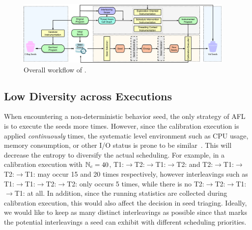 \begin{figure}[ht]
    \centering
    \includegraphics[width=0.95\textwidth]{res/mtfuzz/overview.pdf}
    \caption{Overall workflow of \mtfuzz.}
    \label{fig:workflow}
\end{figure} 
\subsection{Low Diversity across Executions}\label{sec:afl_issue_mt}
When encountering a non-deterministic behavior seed, the only strategy of AFL is to execute the seeds more times. However, since the calibration execution is applied \emph{continuously} \Ncal times, the systematic level environment such as CPU usage, memory consumption, or other I/O status is prone to be similar~\cite{posixstd,tlpi}. This will decrease the entropy to diversify the actual scheduling. For example, in a calibration execution with $\mathbb{N}_{c}=40$,  T1:$\rightarrow$T2:$\rightarrow$T1:$\rightarrow$T2: and T2:$\rightarrow$T1:$\rightarrow$T2:$\rightarrow$T1: may occur 15 and 20 times respectively, however interleavings such as T1:$\rightarrow$T1:$\rightarrow$T2:$\rightarrow$T2: only occurs 5 times, while there is no T2:$\rightarrow$T2:$\rightarrow$T1:$\rightarrow$T1: at all. In addition, since the running statistics are collected during calibration execution, this would also affect the decision in seed triaging. Ideally, we would like to keep as many distinct interleavings as possible since that marks the potential interleavings a seed can exhibit with different scheduling priorities.



